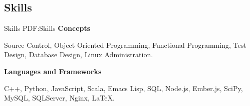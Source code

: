 \documentclass[letterpaper,10pt,oneside]{article}
\begin{document}
\begin{body}

\section
{Skills}
{Skills}
{PDF:Skills}
{\textbf{Concepts}} 
\par
Source Control, Object Oriented Programming, Functional Programming, Test Design, Database Design, Linux Administration. 
 
\EntryGap

{\textbf{Languages and Frameworks}} 
\par
C++, Python, JavaScript, Scala, Emacs Lisp, SQL, Node.js, Ember.js, SciPy, MySQL, SQLServer, Nginx,
{\LaTeX}.

\end{body}

\end{document}
